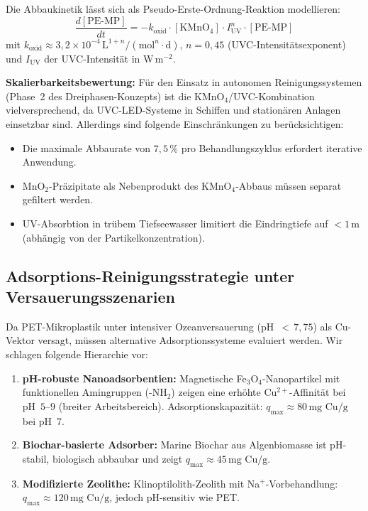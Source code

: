 ﻿\documentclass[12pt,a4paper]{article}
\theoremstyle{definition}
\theoremstyle{remark}
\begin{document}
Die Abbaukinetik l\"asst sich als Pseudo-Erste-Ordnung-Reaktion modellieren:
\begin{equation}
  \frac{d[\text{PE-MP}]}{dt} = -k_{\text{oxid}} \cdot [\text{KMnO}_4] \cdot
  I_{\text{UV}}^n \cdot [\text{PE-MP}]
  \label{eq:oxidation_kinetics}
\end{equation}
mit $k_{\text{oxid}} \approx 3{,}2 \times 10^{-4}\,\text{L}^{1+n}/(\text{mol}^n \cdot \text{d})$,
$n = 0{,}45$ (UVC-Intensit\"atsexponent) und $I_{\text{UV}}$ der UVC-Intensit\"at
in W\,m$^{-2}$.

\textbf{Skalierbarkeitsbewertung:} F\"ur den Einsatz in autonomen Reinigungssystemen
(Phase~2 des Dreiphasen-Konzepts) ist die KMnO$_4$/UVC-Kombination vielversprechend,
da UVC-LED-Systeme in Schiffen und stationären Anlagen einsetzbar sind.
Allerdings sind folgende Einschr\"ankungen zu ber\"ucksichtigen:
\begin{itemize}[noitemsep]
  \item Die maximale Abbaurate von $7{,}5\,\%$ pro Behandlungszyklus
    erfordert iterative Anwendung.
  \item MnO$_2$-Pr\"azipitate als Nebenprodukt des KMnO$_4$-Abbaus m\"ussen
    separat gefiltert werden.
  \item UV-Absorbtion in tr\"ubem Tiefseewasser limitiert die Eindringtiefe auf
    $< 1$\,m (abhängig von der Partikelkonzentration).
\end{itemize}

\subsection{Adsorptions-Reinigungsstrategie unter Versauerungsszenarien}
\label{subsec:adsorption_strategy}

Da PET-Mikroplastik unter intensiver Ozeanversauerung (pH~$<\,7{,}75$) als
Cu-Vektor versagt, m\"ussen alternative Adsorptionssysteme evaluiert werden.
Wir schlagen folgende Hierarchie vor:

\begin{enumerate}[leftmargin=*, label=\textbf{A\arabic*.}]
  \item \textbf{pH-robuste Nanoadsorbentien:} Magnetische Fe$_3$O$_4$-Nanopartikel
    mit funktionellen Amingruppen (-NH$_2$) zeigen eine erh\"ohte
    Cu$^{2+}$-Affinit\"at bei pH~$5$--$9$ (breiter Arbeitsbereich).
    Adsorptionskapazit\"at: $q_{\max} \approx 80\,\text{mg Cu/g}$ bei pH~7.
  \item \textbf{Biochar-basierte Adsorber:} Marine Biochar aus Algenbiomasse
    ist pH-stabil, biologisch abbaubar und zeigt $q_{\max} \approx 45\,\text{mg Cu/g}$.
  \item \textbf{Modifizierte Zeolithe:} Klinoptilolith-Zeolith mit
    Na$^+$-Vorbehandlung: $q_{\max} \approx 120\,\text{mg Cu/g}$,
    jedoch pH-sensitiv wie PET.
\end{enumerate}
\end{document}
